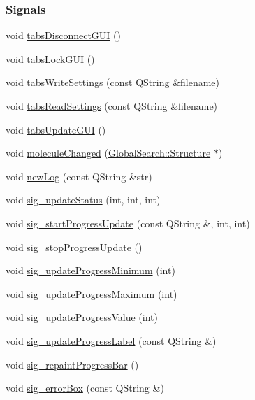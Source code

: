 \subsubsection*{Signals}
\begin{DoxyCompactItemize}
\item 
void \hyperlink{classGlobalSearch_1_1AbstractDialog_a3557cb9d441d0aabbd9ee3aa8cfdaea9}{tabs\+Disconnect\+G\+U\+I} ()
\item 
void \hyperlink{classGlobalSearch_1_1AbstractDialog_a93ef632734bcb7228216f5685e90e3f1}{tabs\+Lock\+G\+U\+I} ()
\item 
void \hyperlink{classGlobalSearch_1_1AbstractDialog_a17e7f95159cbbf74b44739636271bc59}{tabs\+Write\+Settings} (const Q\+String \&filename)
\item 
void \hyperlink{classGlobalSearch_1_1AbstractDialog_aac4850039323bd7bf05f048bc7e8437e}{tabs\+Read\+Settings} (const Q\+String \&filename)
\item 
void \hyperlink{classGlobalSearch_1_1AbstractDialog_aea96d15a1dcd0715e4cd2b4377f052d0}{tabs\+Update\+G\+U\+I} ()
\item 
void \hyperlink{classGlobalSearch_1_1AbstractDialog_ac9ca934578ad9620bf49b9074a2b6982}{molecule\+Changed} (\hyperlink{classGlobalSearch_1_1Structure}{Global\+Search\+::\+Structure} $\ast$)
\item 
void \hyperlink{classGlobalSearch_1_1AbstractDialog_a94fdb4c5a3ec5963f2764f0d821b2583}{new\+Log} (const Q\+String \&str)
\item 
void \hyperlink{classGlobalSearch_1_1AbstractDialog_a99f0d05314c6da0ceb54cac2fd911c00}{sig\+\_\+update\+Status} (int, int, int)
\item 
void \hyperlink{classGlobalSearch_1_1AbstractDialog_a85a70ecb4d340cfeae15c18f69419827}{sig\+\_\+start\+Progress\+Update} (const Q\+String \&, int, int)
\item 
void \hyperlink{classGlobalSearch_1_1AbstractDialog_a738c3769545f233bb38b45a4724d527d}{sig\+\_\+stop\+Progress\+Update} ()
\item 
void \hyperlink{classGlobalSearch_1_1AbstractDialog_ab4aa18927ac8220ed98cdd6367eb1416}{sig\+\_\+update\+Progress\+Minimum} (int)
\item 
void \hyperlink{classGlobalSearch_1_1AbstractDialog_a8eb81a20fe5ad425482d3400d868fa16}{sig\+\_\+update\+Progress\+Maximum} (int)
\item 
void \hyperlink{classGlobalSearch_1_1AbstractDialog_adac485f7c7d5ac013a12b183a814da95}{sig\+\_\+update\+Progress\+Value} (int)
\item 
void \hyperlink{classGlobalSearch_1_1AbstractDialog_a4201bb13ca8322d5031ad7065d9f4afd}{sig\+\_\+update\+Progress\+Label} (const Q\+String \&)
\item 
void \hyperlink{classGlobalSearch_1_1AbstractDialog_a171b7b488362e506ba05e1016d3de0b0}{sig\+\_\+repaint\+Progress\+Bar} ()
\item 
void \hyperlink{classGlobalSearch_1_1AbstractDialog_a3d14409c0c74cea8b4b3e32e3a9eb7d0}{sig\+\_\+error\+Box} (const Q\+String \&)
\end{DoxyCompactItemize}
